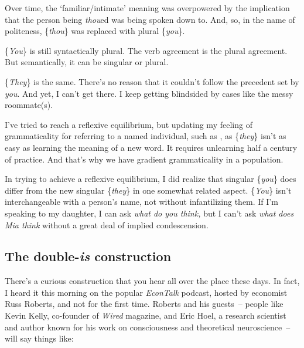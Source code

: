 Over time, the `familiar/intimate' meaning was overpowered by the implication that the person being \textit{thou}ed was being spoken down to. And, so, in the name of politeness, \{\textit{thou}\} was replaced with plural \{\textit{you}\}.

\{\textit{You}\} is still syntactically plural. The verb agreement is the plural agreement. But semantically, it can be singular or plural.

\{\textit{They}\} is the same. There's no reason that it couldn't follow the precedent set by \textit{you}. And yet, I can't get there. I keep getting blindsided by cases like the messy roommate(s).

I've tried to reach a reflexive equilibrium, but updating my feeling of grammaticality for referring to a named individual, such as , as \{\textit{they}\} isn't as easy as learning the meaning of a new word. It requires unlearning half a century of practice. And that's why we have gradient grammaticality in a population.

In trying to achieve a reflexive equilibrium, I did realize that singular \{\textit{you}\} does differ from the new singular \{\textit{they}\} in one somewhat related aspect. \{\textit{You}\} isn't interchangeable with a person's name, not without infantilizing them. If I'm speaking to my daughter, I can ask \textit{what do you think,} but I can't ask \textit{what does Mia think} without a great deal of implied condescension.
\newpage
\subsection{The double-\textit{is} construction}

There's a curious construction that you hear all over the place these days. In fact, I heard it this morning on the popular \textit{EconTalk} podcast, hosted by economist Russ Roberts, and not for the first time. Roberts and his guests~-- people like Kevin Kelly, co-founder of \textit{Wired} magazine, and Eric Hoel, a research scientist and author known for his work on consciousness and theoretical neuroscience~-- will say things like:

\ea
 \z
\z

